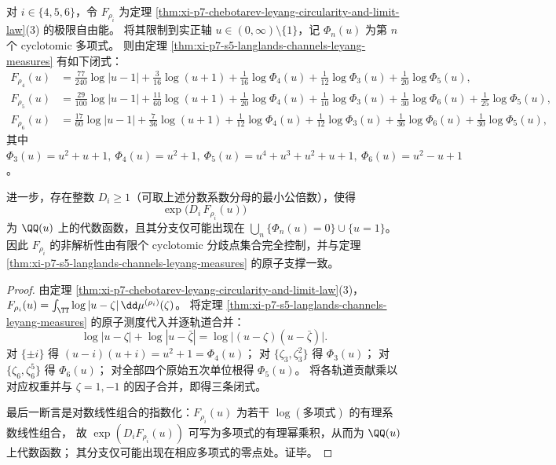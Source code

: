 \begin{theorem}\label{thm:xi-p7-s5-cyclotomic-free-energy-closed-form}
对 \(i\in\{4,5,6\}\)，令 \(F_{\rho_i}\) 为定理 \ref{thm:xi-p7-chebotarev-leyang-circularity-and-limit-law}(3) 的极限自由能。
将其限制到实正轴 \(u\in(0,\infty)\setminus\{1\}\)，记 \(\Phi_n(u)\) 为第 \(n\) 个 cyclotomic 多项式。
则由定理 \ref{thm:xi-p7-s5-langlands-channels-leyang-measures} 有如下闭式：
\[
\boxed{\begin{aligned}
F_{\rho_4}(u)
&=\frac{77}{240}\log|u-1|+\frac{3}{16}\log(u+1)
+\frac{1}{16}\log\Phi_4(u)+\frac{1}{12}\log\Phi_3(u)+\frac{1}{20}\log\Phi_5(u),\\[1mm]
F_{\rho_5}(u)
&=\frac{29}{100}\log|u-1|+\frac{11}{60}\log(u+1)
+\frac{1}{20}\log\Phi_4(u)+\frac{1}{10}\log\Phi_3(u)+\frac{1}{30}\log\Phi_6(u)+\frac{1}{25}\log\Phi_5(u),\\[1mm]
F_{\rho_6}(u)
&=\frac{17}{60}\log|u-1|+\frac{7}{36}\log(u+1)
+\frac{1}{12}\log\Phi_4(u)+\frac{1}{12}\log\Phi_3(u)+\frac{1}{36}\log\Phi_6(u)+\frac{1}{30}\log\Phi_5(u),
\end{aligned}}
\]
其中
\(
\Phi_3(u)=u^2+u+1,\ \Phi_4(u)=u^2+1,\ \Phi_5(u)=u^4+u^3+u^2+u+1,\ \Phi_6(u)=u^2-u+1
\)。
\par
进一步，存在整数 \(D_i\ge 1\)（可取上述分数系数分母的最小公倍数），使得
\[
\exp\!\bigl(D_i\,F_{\rho_i}(u)\bigr)
\]
为 \(\QQ(u)\) 上的代数函数，且其分支仅可能出现在
\(
\bigcup_n\{\Phi_n(u)=0\}\cup\{u=1\}
\)。
因此 \(F_{\rho_i}\) 的非解析性由有限个 cyclotomic 分歧点集合完全控制，并与定理 \ref{thm:xi-p7-s5-langlands-channels-leyang-measures} 的原子支撑一致。
\end{theorem}
\begin{proof}
由定理 \ref{thm:xi-p7-chebotarev-leyang-circularity-and-limit-law}(3)，
\(
F_{\rho_i}(u)=\int_{\TT}\log|u-\zeta|\,\dd\mu^{(\rho_i)}(\zeta)
\)。
将定理 \ref{thm:xi-p7-s5-langlands-channels-leyang-measures} 的原子测度代入并逐轨道合并：
\[
\log|u-\zeta|+\log|u-\bar\zeta|
=\log\bigl|(u-\zeta)(u-\bar\zeta)\bigr|.
\]
对 \(\{\pm i\}\) 得 \((u-i)(u+i)=u^2+1=\Phi_4(u)\)；
对 \(\{\zeta_3,\zeta_3^2\}\) 得 \(\Phi_3(u)\)；
对 \(\{\zeta_6,\zeta_6^5\}\) 得 \(\Phi_6(u)\)；
对全部四个原始五次单位根得 \(\Phi_5(u)\)。
将各轨道贡献乘以对应权重并与 \(\zeta=1,-1\) 的因子合并，即得三条闭式。
\par
最后一断言是对数线性组合的指数化：\(F_{\rho_i}(u)\) 为若干 \(\log(\text{多项式})\) 的有理系数线性组合，
故 \(\exp(D_iF_{\rho_i}(u))\) 可写为多项式的有理幂乘积，从而为 \(\QQ(u)\) 上代数函数；
其分支仅可能出现在相应多项式的零点处。证毕。
\end{proof}

